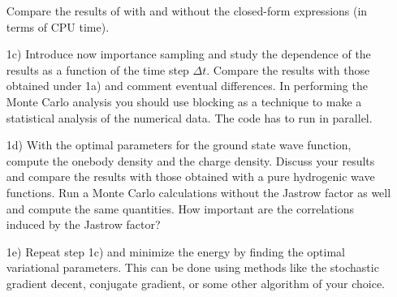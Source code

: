 \begin{enumerate}
Compare the results of with and without the closed-form expressions (in terms of CPU time).

\item[1c)] 
Introduce now importance sampling and study the dependence of the results as a function of the time step $\Delta t$. Compare the results with those obtained under 1a) and comment eventual differences. In performing the Monte Carlo analysis you should use blocking\cite{FLY89} as a technique to make a statistical analysis of the numerical data. The code has to run in parallel.

\item[1d)]  
With the optimal parameters for the ground state wave function, compute the onebody density and the charge density. Discuss your results and compare the results with those obtained with a pure hydrogenic wave functions. Run a Monte Carlo calculations without the Jastrow factor as well and compute the same quantities. How important are the correlations induced by the Jastrow factor?

\item[1e)]  
Repeat step 1c) and minimize the energy by finding the optimal variational parameters. This can be done using methods like the stochastic gradient decent\cite{SGA}, conjugate gradient, or some other algorithm of your choice.

\end{enumerate}